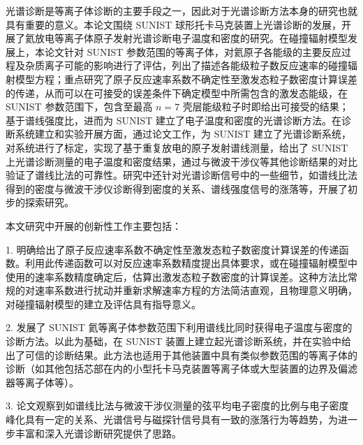 \begin{cabstract}
光谱诊断是等离子体诊断的主要手段之一，因此对于光谱诊断方法本身的研究也就具有重要的意义。本论文围绕 SUNIST 球形托卡马克装置上光谱诊断的发展，开展了氦放电等离子体原子发射光谱诊断电子温度和密度的研究。在碰撞辐射模型发展上，本论文针对 SUNIST 参数范围的等离子体，对氦原子各能级的主要反应过程及杂质离子可能的影响进行了评估，列出了描述各能级粒子数反应速率的碰撞辐射模型方程；重点研究了原子反应速率系数不确定性至激发态粒子数密度计算误差的传递，从而可以在可接受的误差条件下确定模型中所需包含的激发态能级，在 SUNIST 参数范围下，包含至最高 $n = 7$ 壳层能级粒子时即给出可接受的结果；基于谱线强度比，进而为 SUNIST 建立了电子温度和密度的光谱诊断方法。在诊断系统建立和实验开展方面，通过论文工作，为 SUNIST 建立了光谱诊断系统，对系统进行了标定，实现了基于重复放电的原子发射谱线测量，给出了 SUNIST 上光谱诊断测量的电子温度和密度结果，通过与微波干涉仪等其他诊断结果的对比验证了谱线比法的可靠性。研究中还针对光谱诊断信号中的一些细节，如谱线比法得到的密度与微波干涉仪诊断得到密度的关系、谱线强度信号的涨落等，开展了初步的探索研究。

本文研究中开展的创新性工作主要包括：

1. 明确给出了原子反应速率系数不确定性至激发态粒子数密度计算误差的传递函数。利用此传递函数可以对反应速率系数精度提出具体要求，或在碰撞辐射模型中使用的速率系数精度确定后，估算出激发态粒子数密度的计算误差。这种方法比常规的对速率系数进行扰动并重新求解速率方程的方法简洁直观，且物理意义明确，对碰撞辐射模型的建立及评估具有指导意义。

2. 发展了 SUNIST 氦等离子体参数范围下利用谱线比同时获得电子温度与密度的诊断方法。以此为基础，在 SUNIST 装置上建立起光谱诊断系统，并在实验中给出了可信的诊断结果。此方法也适用于其他装置中具有类似参数范围的等离子体的诊断（如其他包括芯部在内的小型托卡马克装置等离子体或大型装置的边界及偏滤器等离子体等）。

3. 论文观察到如谱线比法与微波干涉仪测量的弦平均电子密度的比例与电子密度峰化具有一定的关系、光谱信号与磁探针信号具有一致的涨落行为等趋势，为进一步丰富和深入光谱诊断研究提供了思路。
\vspace{-0.05em}
\end{cabstract}


